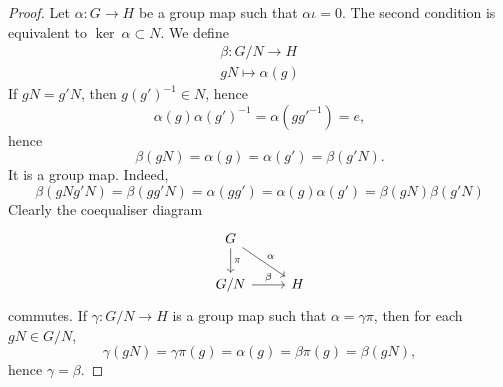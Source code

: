 \begin{proof}
    Let $\alpha : G\rightarrow H$ be a group map such that $\alpha\iota = 0$. The second condition is equivalent to $\ker\ \alpha \subset N$. We define 
    \begin{gather*}
        \beta : G/N \rightarrow H\\
        gN \mapsto \alpha(g)
    \end{gather*}
    If $gN = g'N$, then $g(g')^{-1}\in N$, hence 
    $$
        \alpha(g)\alpha(g')^{-1}=\alpha(gg'^{-1}) = e,
    $$
    hence 
    $$
        \beta(gN)=\alpha(g)=\alpha(g')=\beta(g'N).
    $$
    It is a group map. Indeed, 
    $$
        \beta(gNg'N)=\beta(gg'N)= \alpha(gg')=\alpha(g)\alpha(g')=\beta(gN)\beta(g'N)
    $$
    Clearly the coequaliser diagram
    $$
        \begin{tikzcd}
            G \arrow[rd,"\alpha"] \arrow[d, "\pi"] \\
            G/N \arrow[r,"\beta"] & H
        \end{tikzcd}
    $$
    commutes. If $\gamma: G/N\rightarrow H$ is a group map such that $\alpha = \gamma\pi$, then for each $gN\in G/N$,
    $$
        \gamma(gN)=\gamma\pi(g) = \alpha(g)= \beta\pi(g)=\beta(gN),
    $$
    hence $\gamma=\beta$.
\end{proof}


